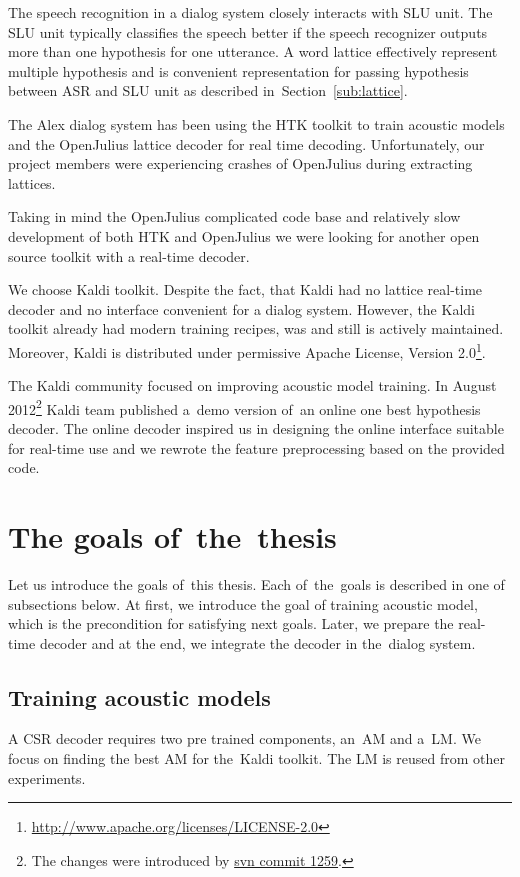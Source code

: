 The speech recognition in a dialog system closely interacts with \acl{SLU} unit.
The \ac{SLU} unit typically classifies the speech better 
if the speech recognizer outputs more than one hypothesis for one utterance. 
A word lattice effectively represent multiple hypothesis and is convenient
representation for passing hypothesis between \ac{ASR} and \ac{SLU} unit 
as described in~Section~\ref{sub:lattice}.

The Alex dialog system has been using the \ac{HTK} toolkit\cite{young94htk} 
to train acoustic models and 
the OpenJulius\cite{lee2009julius} lattice decoder for real time decoding. 
Unfortunately, our project members were experiencing crashes 
of OpenJulius during extracting lattices.

Taking in mind the OpenJulius complicated code base and relatively slow
development of both \ac{HTK} and OpenJulius we were looking 
for another open source toolkit with a real-time decoder.

We choose Kaldi toolkit. Despite the fact,  that Kaldi had no lattice real-time decoder
and no interface convenient for a dialog system.
However, the Kaldi toolkit already had modern training recipes, 
was and still is actively maintained. Moreover, Kaldi is distributed 
under permissive Apache License, Version 2.0\footnote{\url{http://www.apache.org/licenses/LICENSE-2.0}}.

The Kaldi community focused on improving acoustic model training. 
In August 2012\footnote{The changes were introduced by \href{https://sourceforge.net/p/kaldi/code/1259/}{svn commit 1259}.}
Kaldi team published a~demo version of~an online one best hypothesis decoder.
The online decoder inspired us in designing 
the online interface suitable for real-time use and
we rewrote the feature preprocessing based on the provided code.

\section{The goals of~the~thesis} 
\label{sec:goals}
Let us introduce the goals of~this thesis. Each of~the~goals is described in one of subsections below.
At first, we introduce the goal of training acoustic model, which is the precondition for satisfying next goals.
Later, we prepare the real-time decoder and at the end, we integrate the decoder in the~dialog system. 

\subsection{Training acoustic models} 
\label{sub:training_kaldi_acoustic_models}
A \acl{CSR} decoder requires two pre trained components, an~\acl{AM} and 
a~\acl{LM}. We focus on finding the best \acl{AM} for the~Kaldi toolkit. 
The \acl{LM} is reused from other experiments.

